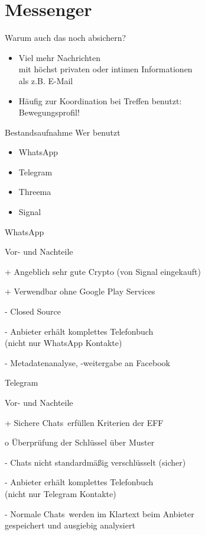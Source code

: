 \section{Messenger}
\begin{frame}{Warum auch das noch absichern?}
\begin{itemize}
\item Viel mehr Nachrichten\\ mit höchst privaten oder intimen Informationen\\ als z.B. E-Mail
\item Häufig zur Koordination bei Treffen benutzt:\\ Bewegungsprofil!
\end{itemize}

\pause
\begin{block}{Bestandsaufnahme}
Wer benutzt
\begin{itemize}
\item<+-> WhatsApp
\item<+-> Telegram
\item<+-> Threema
\item<+-> Signal
\end{itemize}
\end{block}
\end{frame}

\begin{frame}{WhatsApp}
\begin{blex}{Vor- und Nachteile}
\item[+] Angeblich sehr gute Crypto (von Signal eingekauft)
\item[+] Verwendbar ohne Google Play Services
\item[-] Closed Source
\item[-] Anbieter erhält komplettes Telefonbuch\\ (nicht nur WhatsApp Kontakte)
\item[-] Metadatenanalyse, -weitergabe an Facebook
\end{blex}
\end{frame}

\begin{frame}{Telegram}
\begin{blex}{Vor- und Nachteile}
\item[+] \glqq Sichere Chats\grqq\ erfüllen Kriterien der EFF
\item[o] Überprüfung der Schlüssel über Muster
\item[-] Chats nicht standardmäßig verschlüsselt (\glqq sicher\grqq)
\item[-] Anbieter erhält komplettes Telefonbuch\\ (nicht nur Telegram Kontakte)
\item[-] \glqq Normale Chats\grqq\ werden im Klartext beim Anbieter\\ gespeichert und ausgiebig analysiert
\end{blex}
\end{frame}

